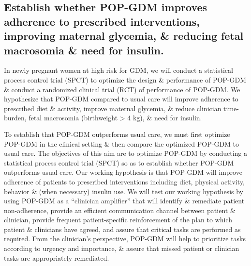 \subsection{Establish whether POP-GDM improves
adherence to prescribed interventions, improving maternal glycemia, \&
reducing fetal macrosomia \& need for insulin.} In newly pregnant women
at high risk for GDM, we will conduct a statistical process control
trial (SPCT) to optimize the design \& performance of POP-GDM \&
conduct a randomized clinical trial (RCT) of performance of
POP-GDM. We hypothesize that POP-GDM compared to usual care will
improve adherence to prescribed diet \& activity, improve maternal
glycemia, \& reduce clinician time-burden, fetal macrosomia
(birthweight > 4 kg), \& need for insulin.

To establish that POP-GDM outperforms usual care, we must first
optimize POP-GDM in the clinical setting \& then compare the optimized
POP-GDM to usual care. The objectives of this aim are to optimize
POP-GDM by conducting a statistical process control trial (SPCT) so as to
establish whether POP-GDM outperforms usual care. Our working
hypothesis is that POP-GDM will improve adherence of patients to
prescribed interventions including diet, physical activity, behavior
\& (when necessary) insulin use. We will test our working hypothesis
by using POP-GDM as a “clinician amplifier” that will identify \&
remediate patient non-adherence, provide an efficient communication
channel between patient \& clinician, provide frequent
patient-specific reinforcement of the plan to which patient \&
clinicians have agreed, and assure that critical tasks are performed
as required. From the clinician's perspective, POP-GDM will help to
prioritize tasks according to urgency and importance, \& assure that
missed patient or clinician tasks are appropriately remediated.

